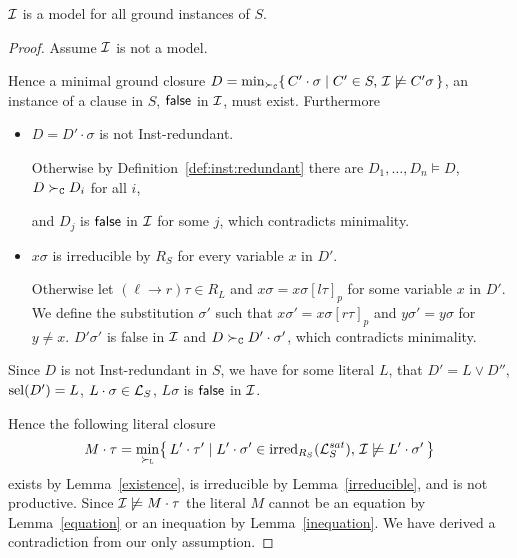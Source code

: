        \begin{lemma}\label{lemma:model:is:candidate}
           \( \mathcal{I} \) is a model for all ground instances of \( S \). 
       \end{lemma}

       \begin{proof}
            Assume \( \mathcal{I} \) is not a model.

            Hence a minimal ground closure \(
                D = \min_{\mathrel\succ_{\mathtt{C}}} \{ \,
                C'\cdot\sigma \mid C'\in S, \,
               \mathcal{I}\not\models C'\sigma \,
               \} \),
                an instance of a clause in \( S \),
               \( \mathsf{false} \) in \( \mathcal{I} \), must exist. Furthermore 

       \begin{itemize}
           \item \( D = D'\cdot\sigma \) is not Inst-redundant.
           
            Otherwise by Definition~\ref{def:inst:redundant} there are
           \( D_1,\ldots,D_n\models D \), \( D\mathrel\succ_{\mathtt{C}} D_i \) for all \( i \),

            and \( D_j \) is \( \mathsf{false} \) in \( \mathcal{I} \) for some \( j \), which contradicts minimality.
           \hfill

           \item \( x\sigma \) is irreducible by \( R_S \) for every variable \( x \) in \( D' \).
           \vspace{0.2em}

            Otherwise let \( (\ell\to r)\tau\in R_L \) and \( x\sigma = x\sigma{[l\tau]}_p \) for some variable \( x \) in \( D' \).
            We define the substitution \( \sigma' \) such that \( x\sigma' = x\sigma{[r\tau]}_p \) and \( y\sigma' = y\sigma \) for \( y\neq x \).
           \( D'\sigma' \) is false in \( \mathcal{I} \) and \( D\mathrel\succ_{\mathtt{C}} D'\cdot\sigma' \),
            which contradicts minimality.\hfill
       \end{itemize}

        Since \( D \) is not Inst-redundant in \( S \),
        we have for some literal \( L \),
        that \( D' = L\lor D'' \), \( \operatorname{sel}(D') = L \), \( L\cdot\sigma\in\mathcal{L}_S \),
       \( L\sigma \) is \( \mathsf{false} \) in \( \mathcal{I} \).
       \vspace{0.7em}

        Hence the following literal closure
       \begin{gather*}
            M\cdot\tau = \min_{\mathrel\succ_{\mathtt{L}}}\!
   \left \{ \,
        L'\cdot\tau' \mid
        L'\cdot\sigma' \in \operatorname{irred}_{R_S}(\mathcal{L}_S^{sat}), \,
       \mathcal{I}\not\models L'\cdot\sigma' \,
   \right \}
       \end{gather*}
        exists by Lemma~\ref{existence}, is irreducible by Lemma~\ref{irreducible},
        and is not productive.
        Since \( \mathcal{I}\not\models M\cdot\tau \) the literal
        \(M\) cannot be an equation by Lemma~\ref{equation}
        or an inequation by Lemma~\ref{inequation}.
        We have derived a contradiction from our only assumption.


\end{proof}
